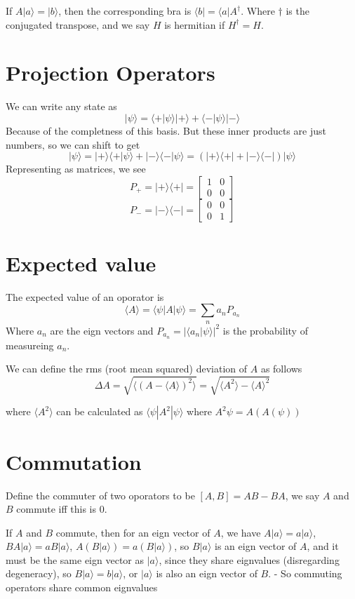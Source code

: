 \documentclass{homework}
\newcommand{\m}[1]{\begin{bmatrix} #1 \end{bmatrix}}
\newcommand{\kt}{\rangle}
\newcommand{\ket}[1]{| #1 \rangle}
\newcommand{\bra}[1]{ \langle #1 |}
\begin{document}
If $A \ket{a} = \ket{b}$, then the corresponding bra is $\bra{b} = \bra{a}A^{\dag}$. Where $\dag$ is the conjugated transpose, and we say $H$ is hermitian if $H^{\dag} = H$.


\section{Projection Operators}

We can write any state as 
\[\ket{\psi} = \bra{+}\psi \rangle \ket{+} + \bra{-}\psi \rangle \ket{-} \]
Because of the completness of this basis. But these inner products are just numbers, so we can shift to get
\[\ket{\psi} = \ket{+}\bra{+}\psi \rangle  +  \ket{-} \bra{-}\psi \rangle = (\ket{+}\bra{+}  +  \ket{-} \bra{-}) \ket{\psi}\]
Representing as matrices, we see
\[P_{+} =\ket{+}\bra{+}  = \m{1 & 0 \\ 0 & 0 }\]
\[P_{-} =\ket{-}\bra{-}  = \m{0 & 0 \\ 0 & 1 }\]


\section{Expected value}

The expected value of an oporator is 
\[\langle A \rangle = \langle \psi | A | \psi \rangle = \sum_{n}a_nP_{a_n}\]
Where $a_n$ are the eign vectors and $P_{a_n} = |\bra{a_n} \psi \rangle|^2$ is the probability of measureing $a_n$. 

We can define the rms (root mean squared) deviation of $A$ as follows
\[\Delta A = \sqrt{\langle (A - \langle A \rangle)^2 \rangle} = \sqrt{\langle A^2 \rangle  - \langle A \rangle^2}\]

where $\langle A^2 \rangle$ can be calculated as $\langle \psi | A^2 | \psi \rangle$ where $A^2 \psi = A(A(\psi))$

\section{Commutation}

Define the commuter of two oporators to be $[A,B] = AB - BA$, we say $A$ and $B$ commute iff this is $0$.

If $A$ and $B$ commute, then for an eign vector of $A$, we have $A | a \kt = a | a \kt$, $BA | a \kt = aB | a \kt$, $A(B| a \kt) = a(B| a \kt)$, so $B| a \kt$ is an eign vector of $A$, and it must be the same eign vector as $| a \kt$, since they share eignvalues (disregarding degeneracy), so $B| a \kt = b| a \kt$, or $| a \kt$ is also an eign vector of $B$. - So commuting operators share common eignvalues
\end{document}
